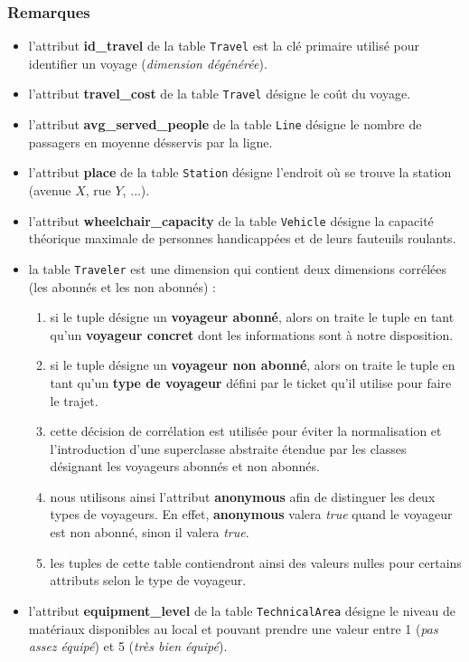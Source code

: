 \documentclass[a4paper,12pt]{report}
\begin{document}
\subsubsection{Remarques}
\begin{itemize}
  \item l'attribut \textbf{id\_travel} de la table \texttt{Travel} est la clé primaire utilisé pour identifier un voyage (\textit{dimension dégénérée}).
  \item l'attribut \textbf{travel\_cost} de la table \texttt{Travel} désigne le coût du voyage.
  \item l'attribut \textbf{avg\_served\_people} de la table \texttt{Line} désigne le nombre de passagers en moyenne désservis par la ligne.
  \item l'attribut \textbf{place} de la table \texttt{Station} désigne l'endroit où se trouve la station (avenue $X$, rue $Y$, $\dots$).
  \item l'attribut \textbf{wheelchair\_capacity} de la table \texttt{Vehicle} désigne la capacité théorique maximale de personnes handicappées et de leurs fauteuils roulants.
  \item la table \texttt{Traveler} est une dimension qui contient deux dimensions corrélées (les abonnés et les non abonnés) :
  \begin{enumerate}
    \item si le tuple désigne un \textbf{voyageur abonné}, alors on traite le tuple en tant qu'un \textbf{voyageur concret} dont les informations sont à notre disposition.
    \item si le tuple désigne un \textbf{voyageur non abonné}, alors on traite le tuple en tant qu'un \textbf{type de voyageur} défini par le ticket qu'il utilise pour faire le trajet.
    \item cette décision de corrélation est utilisée pour éviter la normalisation et l'introduction d'une superclasse abstraite étendue par les classes désignant les voyageurs abonnés et non abonnés.
    \item nous utilisons ainsi l'attribut \textbf{anonymous} afin de distinguer les deux types de voyageurs. En effet, \textbf{anonymous} valera \textit{true} quand le voyageur est non abonné, sinon il valera \textit{true}.
    \item les tuples de cette table contiendront ainsi des valeurs nulles pour certains attributs selon le type de voyageur.
  \end{enumerate}
  \item l'attribut \textbf{equipment\_level} de la table \texttt{TechnicalArea} désigne le niveau de matériaux disponibles au local et pouvant prendre une valeur entre 1 (\textit{pas assez équipé}) et 5 (\textit{très bien équipé}).
\end{itemize}
\end{document}
